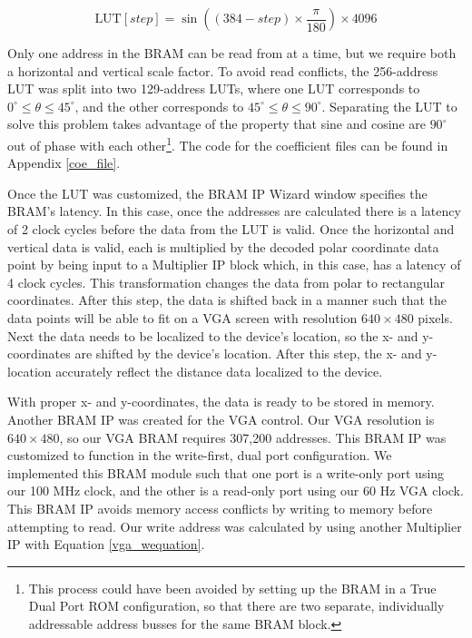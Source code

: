 \begin{equation}
	\textrm{LUT}[step] = \sin((384-step)\times\dfrac{\pi}{180})\times4096
	\label{coe}
\end{equation}

Only one address in the BRAM can be read from at a time, but we require both a horizontal and vertical scale factor. To avoid read conflicts, the 256-address LUT was split into two 129-address LUTs, where one LUT corresponds to $0^\circ{}\leq{}\theta{}\leq45^\circ$, and the other corresponds to $45^\circ{}\leq{}\theta{}\leq90^\circ$. Separating the LUT to solve this problem takes advantage of the property that sine and cosine are $90^\circ$ out of phase with each other\footnote{This process could have been avoided by setting up the BRAM in a True Dual Port ROM configuration, so that there are two separate, individually addressable address busses for the same BRAM block.}. The code for the coefficient files can be found in Appendix \ref{coe_file}.
\par
Once the LUT was customized, the BRAM IP Wizard window specifies the BRAM's latency. In this case, once the addresses are calculated there is a latency of 2 clock cycles before the data from the LUT is valid. Once the horizontal and vertical data is valid, each is multiplied by the decoded polar coordinate data point by being input to a Multiplier IP block which, in this case, has a latency of 4 clock cycles. This transformation changes the data from polar to rectangular coordinates. After this step, the data is shifted back in a manner such that the data points will be able to fit on a VGA screen with resolution $640\times480$ pixels. Next the data needs to be localized to the device's location, so the x- and y-coordinates are shifted by the device's location. After this step, the x- and y-location accurately reflect the distance data localized to the device.
\par
With proper x- and y-coordinates, the data is ready to be stored in memory. Another BRAM IP was created for the VGA control. Our VGA resolution is $640\times480$, so our VGA BRAM requires 307,200 addresses. This BRAM IP was customized to function in the write-first, dual port configuration. We implemented this BRAM module such that one port is a write-only port using our 100 MHz clock, and the other is a read-only port using our 60 Hz VGA clock. This BRAM IP avoids memory access conflicts by writing to memory before attempting to read. Our write address was calculated by using another Multiplier IP with Equation \ref{vga_wequation}.

